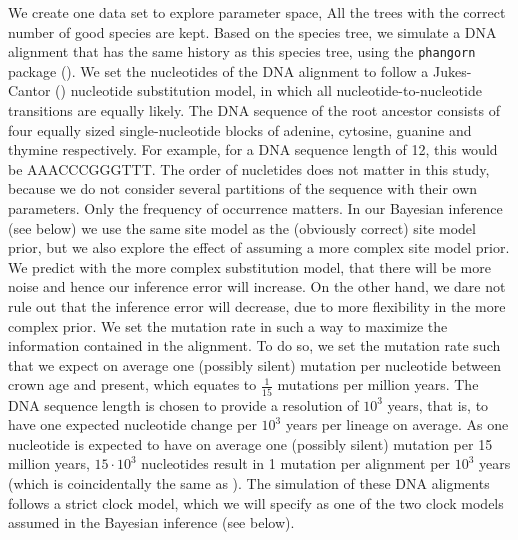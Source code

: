 \documentclass{article}
\begin{document}
We create one data set to explore parameter space, 
All the trees with the correct number of good species are kept.
Based on the species tree, we simulate a DNA alignment that has the same history
as this species tree, using the \verb;phangorn; package (\cite{phangorn}). 
We set the nucleotides of the DNA alignment to follow a Jukes-Cantor (\cite{jc69})
nucleotide substitution model, in which all nucleotide-to-nucleotide transitions
are equally likely. 
The DNA sequence of the root ancestor consists of four equally sized single-nucleotide 
blocks of adenine, cytosine, guanine and thymine respectively. 
For example, for a DNA sequence length of 12, this would be AAACCCGGGTTT. 
The order of nucletides does not matter in this study, 
because we do not consider several partitions of the sequence with their own parameters. 
Only the frequency of occurrence matters.
In our Bayesian inference (see below) we use the same site model as the (obviously correct) site model prior,
but we also explore the effect of assuming a more complex site model prior.
We predict with the more complex substitution model, 
that there will be more noise and hence our inference error will increase.
On the other hand, we dare not rule out that the inference error will decrease,
due to more flexibility in the more complex prior.
We set the mutation rate in such a way to maximize the information contained in the alignment.
To do so, we set the mutation rate such that we expect on average one (possibly silent) mutation per nucleotide
between crown age and present, which equates to $\frac{1}{15}$ mutations
per million years.
The DNA sequence length is chosen to provide a
resolution of $10^3$ years, 
that is, to have one expected nucleotide change 
per $10^3$ years per lineage on average. As one nucleotide is expected 
to have on average one (possibly silent) mutation per 15 million years, $15 \cdot 10^3$
nucleotides result in 1 mutation per alignment per $10^3$ years (which is
coincidentally the same as \cite{moller2018}). 
The simulation of these DNA aligments follows a strict clock model, 
which we will specify as one of the two clock models assumed in the Bayesian inference (see below).
\end{document}
